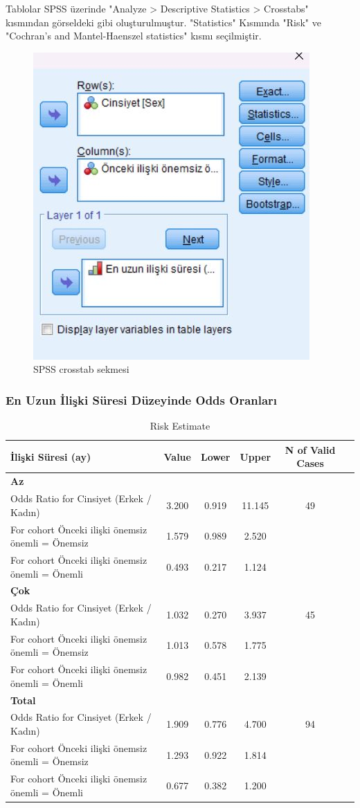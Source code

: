 \documentclass{article}
\begin{document}
Tablolar SPSS üzerinde "Analyze > Descriptive Statistics > Crosstabs" kısmından görseldeki gibi oluşturulmuştur. "Statistics" Kısmında "Risk" ve "Cochran's and Mantel-Haenszel statistics" kısmı seçilmiştir.\\

\begin{figure}[h!t]
    \centering
    \includegraphics[width=0.5\linewidth]{Imgs/spss_crosstab.jpg}
    \caption{SPSS crosstab sekmesi}
    \label{fig:enter-label}
\end{figure}

\vspace{10pt}
\subsubsection{En Uzun İlişki Süresi Düzeyinde Odds Oranları}
\begin{table}[htbp]
\centering
\caption{Risk Estimate}
\label{tab:risk-estimate}
\begin{tabular}{lccccc}
\hline
\textbf{İlişki Süresi (ay)} & \textbf{Value} & \textbf{Lower} & \textbf{Upper} & \textbf{N of Valid Cases} \\
\hline
\textbf{Az} & & & & \\
Odds Ratio for Cinsiyet (Erkek / Kadın) & 3.200 & 0.919 & 11.145 & 49 \\
For cohort Önceki ilişki önemsiz önemli = Önemsiz & 1.579 & 0.989 & 2.520 & \\
For cohort Önceki ilişki önemsiz önemli = Önemli & 0.493 & 0.217 & 1.124 & \\
\hline
\textbf{Çok} & & & & \\
Odds Ratio for Cinsiyet (Erkek / Kadın) & 1.032 & 0.270 & 3.937 & 45 \\
For cohort Önceki ilişki önemsiz önemli = Önemsiz & 1.013 & 0.578 & 1.775 & \\
For cohort Önceki ilişki önemsiz önemli = Önemli & 0.982 & 0.451 & 2.139 & \\
\hline
\textbf{Total} & & & & \\
Odds Ratio for Cinsiyet (Erkek / Kadın) & 1.909 & 0.776 & 4.700 & 94 \\
For cohort Önceki ilişki önemsiz önemli = Önemsiz & 1.293 & 0.922 & 1.814 & \\
For cohort Önceki ilişki önemsiz önemli = Önemli & 0.677 & 0.382 & 1.200 & \\
\hline
\end{tabular}
\end{table}
\end{document}
